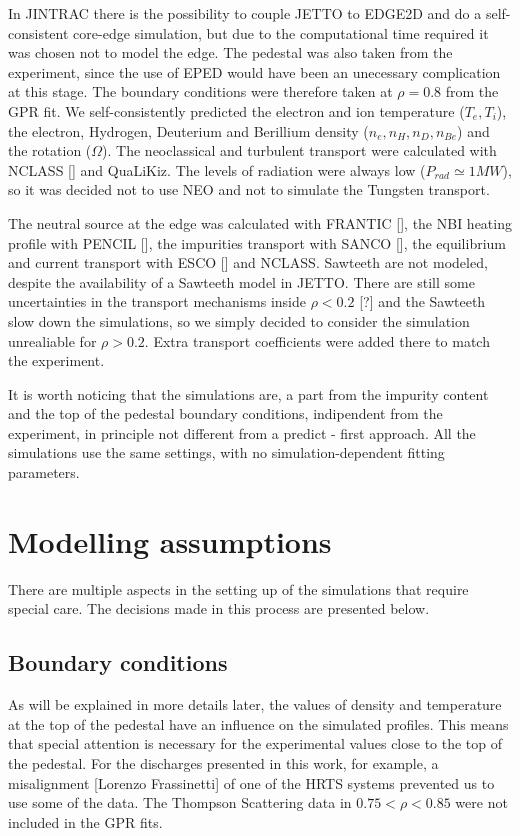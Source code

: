 \documentclass[a4paper,10pt]{iopart}
\begin{document}
In JINTRAC there is the possibility to couple JETTO to EDGE2D and do a self-consistent core-edge simulation, but due to the computational time required it was chosen not to model the edge. The pedestal was also taken from the experiment, since the use of EPED would have been an unecessary complication at this stage. The boundary conditions were therefore taken at $ \rho = 0.8 $ from the GPR fit. We self-consistently predicted the electron and ion temperature ($T_{e}, T_{i}$), the electron, Hydrogen, Deuterium and Berillium density ($n_{e}, n_{H}, n_{D}, n_{Be}$) and the rotation ($\Omega $). The neoclassical and turbulent transport were calculated with NCLASS [] and QuaLiKiz. The levels of radiation were always low ($P_{rad} \simeq 1MW $), so it was decided not to use NEO and not to simulate the Tungsten transport.

The neutral source at the edge was calculated with FRANTIC [], the NBI heating profile with PENCIL [], the impurities transport with SANCO [], the equilibrium and current transport with ESCO [] and NCLASS. Sawteeth are not modeled, despite the availability of a Sawteeth model in JETTO. There are still some uncertainties in the transport mechanisms inside $\rho < 0.2 $ [?] and the Sawteeth slow down the simulations, so we simply decided to consider the simulation unrealiable for $\rho > 0.2 $. Extra transport coefficients were added there to match the experiment.

It is worth noticing that the simulations are, a part from the impurity content and the top of the pedestal boundary conditions, indipendent from the experiment, in principle not different from a predict - first approach. All the simulations use the same settings, with no simulation-dependent fitting parameters.

\section{Modelling assumptions}

There are multiple aspects in the setting up of the simulations that require special care. The decisions made in this process are presented below.

\subsection{Boundary conditions}

As will be explained in more details later, the values of density and temperature at the top of the pedestal have an influence on the simulated profiles. This means that special attention is necessary for the experimental values close to the top of the pedestal. For the discharges presented in this work, for example, a misalignment [Lorenzo Frassinetti] of one of the HRTS systems prevented us to use some of the data. The Thompson Scattering data in $ 0.75 < \rho < 0.85 $ were not included in the GPR fits.
\end{document}
